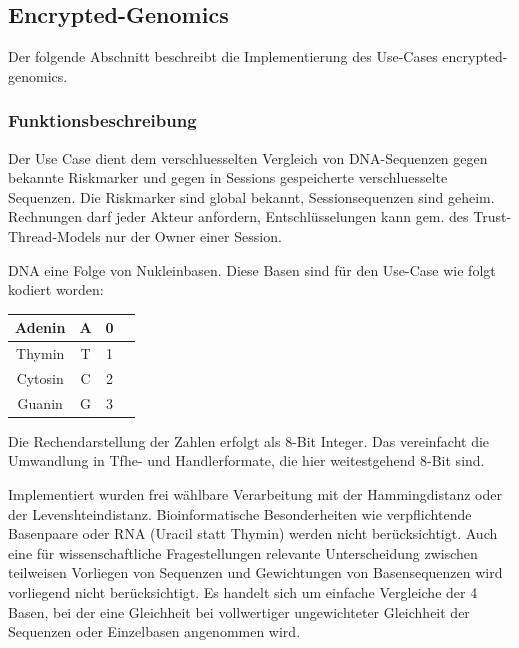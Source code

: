 \subsection{Encrypted-Genomics}
\label{sub:encrypted_genomics}
Der folgende Abschnitt beschreibt die Implementierung des Use-Cases encrypted-genomics. 

\subsubsection{Funktionsbeschreibung}
Der Use Case dient dem verschluesselten Vergleich von DNA-Sequenzen gegen bekannte Riskmarker und gegen in Sessions gespeicherte verschluesselte Sequenzen. Die Riskmarker sind global bekannt, Sessionsequenzen sind geheim. Rechnungen darf jeder Akteur anfordern, Entschlüsselungen kann gem. des Trust-Thread-Models nur der Owner einer Session.

DNA eine Folge von Nukleinbasen. Diese Basen sind für den Use-Case wie folgt kodiert worden:

\begin{table}[h]
\centering
\begin{tabular}{|c|c|c|c|}
\hline
Adenin & A & 0  \\
\hline
Thymin & T & 1 \\
\hline
Cytosin & C & 2 \\
\hline
Guanin & G & 3 \\
\hline
\end{tabular}
\end{table}

Die Rechendarstellung der Zahlen erfolgt als 8-Bit Integer. Das vereinfacht die Umwandlung in Tfhe- und Handlerformate, die hier weitestgehend 8-Bit sind. 

Implementiert wurden frei wählbare Verarbeitung mit der Hammingdistanz oder der Levenshteindistanz. Bioinformatische Besonderheiten wie verpflichtende Basenpaare oder RNA (Uracil statt Thymin) werden nicht berücksichtigt. Auch eine für wissenschaftliche Fragestellungen relevante Unterscheidung zwischen teilweisen Vorliegen von Sequenzen und Gewichtungen von Basensequenzen wird vorliegend nicht berücksichtigt. Es handelt sich um einfache Vergleiche der 4 Basen, bei der eine Gleichheit bei vollwertiger ungewichteter Gleichheit der Sequenzen oder Einzelbasen angenommen wird.  

